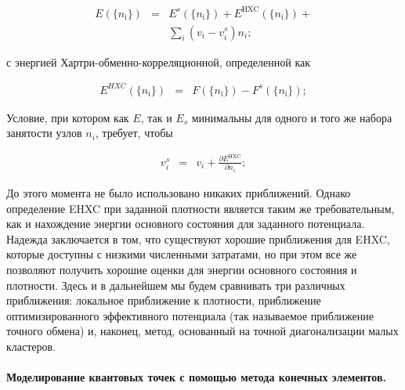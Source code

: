 \documentclass[a4paper,14pt]{extarticle}
\begin{document}
\begin{eqnarray}
    E(\{n_{\text{i}}\}) & = & E^{s}(\{n_{\text{i}}\}) + E^{\text{HXC}}(\{n_{\text{i}}\}) + \nonumber \\
    & & \sum_i (v_i - v^{s}_{i}) n_i;
\end{eqnarray}

с энергией Хартри-обменно-корреляционной, определенной как

\begin{eqnarray}
    E^{HXC}(\{n_{\text{i}}\}) & = & F(\{n_{\text{i}}\}) - F^{s}(\{n_{\text{i}}\});
\end{eqnarray}

Условие, при котором как $E$, так и $E_s$ минимальны для одного и того же набора занятости узлов $n_i$, требует, чтобы

\begin{eqnarray}
    v^{s}_{i} & = & v_{i} + \frac{\partial E^{\text{HXC}}}{\partial n_i};
\end{eqnarray}

До этого момента не было использовано никаких приближений. Однако определение EHXC при заданной плотности является таким же требовательным, как и нахождение энергии основного состояния для заданного потенциала. Надежда заключается в том, что существуют хорошие приближения для EHXC, которые доступны с низкими численными затратами, но при этом все же позволяют получить хорошие оценки для энергии основного состояния и плотности. Здесь и в дальнейшем мы будем сравнивать три различных приближения: локальное приближение к плотности, приближение оптимизированного эффективного потенциала (так называемое приближение точного обмена) и, наконец, метод, основанный на точной диагонализации малых кластеров.

\paragraph{Моделирование квантовых точек с помощью метода конечных элементов.}
\end{document}
